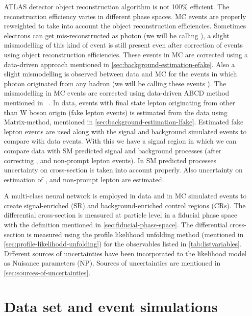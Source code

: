 ATLAS detector object reconstruction algorithm is not 100\% efficient. The reconstruction efficiency varies in different phase spaces. MC events are properly reweighted to take into account the object reconstruction efficiencies. Sometimes electrons can get mis-reconstructed as photon (we will be calling \efake), a slight mismodelling of this kind of event is still present even after correction of events using object reconstruction efficiencies. These \efake events in MC are corrected using a data-driven approach mentioned in \cref{sec:background-estimation-efake}. Also a slight mismodelling is observed between data and MC for the events in which photon originated from any hadron (we will be calling these events \hfake). The mismodelling in MC \hfake events are corrected using data-driven ABCD method mentioned in ~\cite{DiezPardos:2781712}. In data, events with final state lepton originating from other than W boson origin (fake lepton events) is estimated from the data using Matrix-method, mentioned in \cref{sec:background-estimation-lfake}. Estimated fake lepton events are used along with the signal and background simulated events to compare with data events. With this we have a signal region in which we can compare data with SM predicted signal and background processes (after correcting \efake, \hfake and non-prompt lepton events). In SM predicted processes uncertainty on cross-section is taken into account properly. Also uncertainty on estimation of \efake, \hfake and non-prompt lepton are estimated.

A multi-class neural network is employed in data and in MC simulated events to create signal-enriched (SR) and background-enriched control regions (CRs). The differential cross-section is measured at particle level in a fiducial phase space with the definition mentioned in \cref{sec:fiducial-phase-space}. The differential cross-section is measured using the profile likelihood unfolding method (mentioned in \cref{sec:profile-likelihodd-unfolding}) for the observables listed in \cref{tab:listvariables}.
Different sources of uncertainties have been incorporated to the likelihood model as Nuisance parameters (NP). Sources of uncertainties are mentioned in \cref{sec:sources-of-uncertainties}.



\section{Data set and event simulations}
\label{sec:data-and-mc-simulations}


